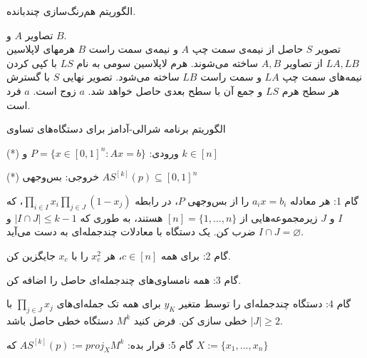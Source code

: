 \begin{algorithm}[!ht]
\caption{الگوریتم هم‌رنگ‌سازی چندبانده.} \label{alg:multibandblending}
\begin{algorithmic}[1]
\REQUIRE تصاویر $A$ و $B$.\\
\ENSURE تصویر $S$ حاصل از  نیمه‌ی سمت چپ $A$ و نیمه‌ی سمت راست $B$
  \STATE هرمهای لاپلاسین $LA,LB$ از تصاویر $A,B$ ساخته می‌شوند.
  \STATE هرم لاپلاسین سومی به نام $LS$ با کپی کردن نیمه‌های سمت چپ $LA$ و سمت راست $LB$ ساخته می‌شود.
  \STATE تصویر نهایی $S$ با گسترش هر سطح هرم $LS$ و جمع آن با سطح بعدی حاصل خواهد شد.   
  \PRINT $a$ زوج است.
  \ELSE 
  \PRINT $a$ فرد است.  
\ENDIF
\end{algorithmic}
\end{algorithm}

\begin{algorithm}[!ht]
\caption{الگوریتم برنامه شرالی-آدامز برای دستگاه‌های تساوی}\label{sh-ad}
\begin{algorithmic}[1]
\item[(*)]
ورودی: $ P=\lbrace x \in [0,1]^{n} : Ax=b \rbrace $ و $ k \in [n] $  
\item[(*)]
خروجی: بس‌وجهی  $ A S^{[k]}(p) \subseteq [0,1]^{n} $
  \item[گام 1:]
  هر معادله $ a_{i}x=b_{i} $ را از بس‌وجهی $ P $، در رابطه $ \prod_{i \in I}x_{i} \prod_{j \in J}(1-x_{j}) $، که $ I $ و $ J $ زیرمجموعه‌هایی از $ [n]=\lbrace 1,...,n \rbrace $ هستند، به طوری ‌که $ \vert I \cap J \vert \leq k-1 $ و $  I \cap J = \varnothing $ ضرب کن. یک دستگاه با معادلات چندجمله‌ای به دست می‌آید.  
   \item[گام 2:]
برای همه $ c \in [n] $، هر $ x_{c}^{2}$ را با $ x_{c} $ جایگزین کن. 
    \item[گام 3:]
 همه نامساوی‌های چندجمله‌ای حاصل را اضافه کن.
     \item[گام 4:]
 دستگاه چندجمله‌ای را توسط متغیر $ y_{K} $ برای همه تک جمله‌ای‌های $ \prod_{j \in J}x_{j} $ با $ \vert J \vert \geq 2 $ خطی سازی کن. فرض کنید $ M^{k} $ دستگاه خطی حاصل باشد.
    \item[گام 5:]
قرار بده: $ A S^{[k]}(p):=proj _{X} M^{k} $ که $ X:= \lbrace x_{1},...,x_{n} \rbrace $ 
\end{algorithmic}
\end{algorithm}




